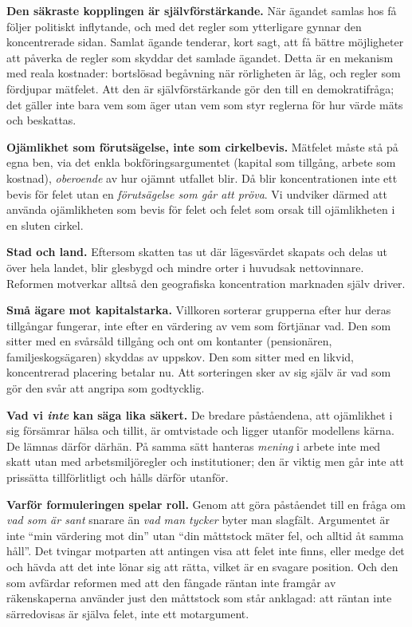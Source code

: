 \documentclass[11pt]{article}
\begin{document}
\textbf{Den säkraste kopplingen är självförstärkande.} När ägandet samlas hos få följer politiskt inflytande, och med det regler som ytterligare gynnar den koncentrerade sidan. Samlat ägande tenderar, kort sagt, att få bättre möjligheter att påverka de regler som skyddar det samlade ägandet. Detta är en mekanism med reala kostnader: bortslösad begåvning när rörligheten är låg, och regler som fördjupar mätfelet. Att den är självförstärkande gör den till en demokratifråga; det gäller inte bara vem som äger utan vem som styr reglerna för hur värde mäts och beskattas.

\textbf{Ojämlikhet som förutsägelse, inte som cirkelbevis.} Mätfelet måste stå på egna ben, via det enkla bokföringsargumentet (kapital som tillgång, arbete som kostnad), \emph{oberoende} av hur ojämnt utfallet blir. Då blir koncentrationen inte ett bevis för felet utan en \emph{förutsägelse som går att pröva}. Vi undviker därmed att använda ojämlikheten som bevis för felet och felet som orsak till ojämlikheten i en sluten cirkel.

\textbf{Stad och land.} Eftersom skatten tas ut där lägesvärdet skapats och delas ut över hela landet, blir glesbygd och mindre orter i huvudsak nettovinnare. Reformen motverkar alltså den geografiska koncentration marknaden själv driver.

\textbf{Små ägare mot kapitalstarka.} Villkoren sorterar grupperna efter hur deras tillgångar fungerar, inte efter en värdering av vem som förtjänar vad. Den som sitter med en svårsåld tillgång och ont om kontanter (pensionären, familjeskogsägaren) skyddas av uppskov. Den som sitter med en likvid, koncentrerad placering betalar nu. Att sorteringen sker av sig själv är vad som gör den svår att angripa som godtycklig.

\textbf{Vad vi \emph{inte} kan säga lika säkert.} De bredare påståendena, att ojämlikhet i sig försämrar hälsa och tillit, är omtvistade och ligger utanför modellens kärna. De lämnas därför därhän. På samma sätt hanteras \emph{mening} i arbete inte med skatt utan med arbetsmiljöregler och institutioner; den är viktig men går inte att prissätta tillförlitligt och hålls därför utanför.

\textbf{Varför formuleringen spelar roll.} Genom att göra påståendet till en fråga om \emph{vad som är sant} snarare än \emph{vad man tycker} byter man slagfält. Argumentet är inte \enquote{min värdering mot din} utan \enquote{din måttstock mäter fel, och alltid åt samma håll}. Det tvingar motparten att antingen visa att felet inte finns, eller medge det och hävda att det inte lönar sig att rätta, vilket är en svagare position. Och den som avfärdar reformen med att den fångade räntan inte framgår av räkenskaperna använder just den måttstock som står anklagad: att räntan inte särredovisas är själva felet, inte ett motargument.
\end{document}
